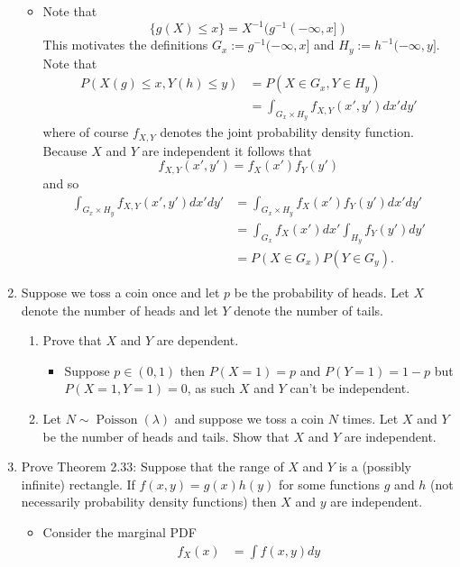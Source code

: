 \documentclass{article}
\begin{document}
\begin{enumerate}
		\begin{itemize}
			\item
			Note that
			$$
			\{g(X) \leq x\} = X^{-1}(g^{-1}(-\infty, x])
			$$
			This motivates the definitions $G_x := g^{-1}(-\infty, x]$ and $H_y := h^{-1}(-\infty, y]$. Note that
			$$
			\begin{aligned}
			P(X(g) \leq x, Y(h) \leq y) &= P(X \in G_x, Y \in H_y) \\
			&= \int_{G_x \times H_y} f_{X, Y}(x', y') dx'dy'
			\end{aligned}
			$$
			where of course $f_{X, Y}$ denotes the joint probability density function. Because $X$ and $Y$ are independent it follows that
			$$
			f_{X, Y}(x', y') = f_X(x')f_Y(y')
			$$
			and so
			$$
			\begin{aligned}
			\int_{G_x \times H_y} f_{X, Y}(x', y') dx'dy' &= \int_{G_x \times H_y} f_X(x')f_Y(y') dx' dy' \\
			&= \int_{G_x} f_X(x')dx'\int_{H_y}f_Y(y')dy' \\
			&= P(X \in G_x)P(Y \in G_y).
			\end{aligned}
			$$
		\end{itemize}
	\item Suppose we toss a coin once and let $p$ be the probability of heads. Let $X$ denote the number of heads and let $Y$ denote the number of tails.
		\begin{enumerate}
			\item Prove that $X$ and $Y$ are dependent.
				\begin{itemize}
					\item Suppose $p \in (0, 1)$ then $P(X = 1) = p$ and $P(Y = 1) = 1 - p$ but $P(X = 1, Y = 1) = 0$, as such $X$ and $Y$ can't be independent.
				\end{itemize}
			\item Let $N \sim \operatorname{Poisson}(\lambda)$ and suppose we toss a coin $N$ times. Let $X$ and $Y$ be the number of heads and tails. Show that $X$ and $Y$ are independent.
		\end{enumerate}
	\item Prove Theorem 2.33: Suppose that the range of $X$ and $Y$ is a (possibly infinite) rectangle. If $f(x, y) = g(x)h(y)$ for some functions $g$ and $h$ (not necessarily probability density functions) then $X$ and $y$ are independent.
		\begin{itemize}
			\item Consider the marginal PDF
			$$
			\begin{aligned}
			f_X(x) &= \int f(x, y) dy \\

\end{aligned}$$
\end{itemize}
\end{enumerate}
\end{document}
